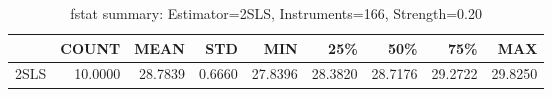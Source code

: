 \begin{table}[ht]
\centering
\caption{fstat summary: Estimator=2SLS, Instruments=166, Strength=0.20}
\begin{tabular}{lrrrrrrrr}
\toprule
 & COUNT & MEAN & STD & MIN & 25\% & 50\% & 75\% & MAX \\
\midrule
2SLS & 10.0000 & 28.7839 & 0.6660 & 27.8396 & 28.3820 & 28.7176 & 29.2722 & 29.8250 \\
\bottomrule
\end{tabular}
\end{table}
